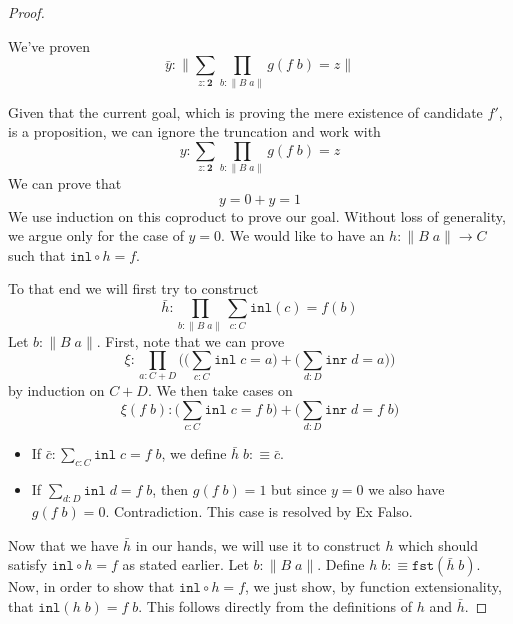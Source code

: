 \documentclass[12pt]{report}
\begin{document}
\begin{proof}
\begin{itemize}
\end{itemize}
We've proven 
$$\bar{y} : \Big\lVert \sum_{z : \mathbf{2}} \prod_{b : \lVert B\; a\rVert} g(f\; b) = z \Big\rVert$$

Given that the current goal, which is proving the mere existence of candidate $f'$, is a proposition, we can ignore the truncation and work with
$$y : \sum_{z : \mathbf{2}} \prod_{b : \lVert B\; a\rVert} g(f\; b) = z$$
We can prove that 
$$y= 0 + y = 1$$ 
We use induction on this coproduct to prove our goal. 
Without loss of generality, we argue only for the case of $y = 0$. 
We would like to have an $h : \lVert B\; a\rVert \rightarrow C$ such that $\mathtt{inl} \circ h = f$. 
\begin{center}
\end{center}
To that end we will first try to construct 
$$\bar{h} : \prod_{b : \lVert B\;a\rVert} \sum_{c:C}\mathtt{inl}(c) = f(b)$$
Let $b : \lVert B\; a\rVert$. 
First, note that we can prove 
$$\xi : \prod_{a: C+D} \Big(\big(\sum_{c : C} \mathtt{inl}\; c = a\big) + \big( \sum_{d:D} \mathtt{inr}\; d = a \big) \Big)$$
by induction on $C+D$. 
We then take cases on 
$$\xi (f\; b) : \big(\sum_{c : C} \mathtt{inl}\; c = f\; b\big) + \big( \sum_{d:D} \mathtt{inr}\; d = f\; b \big)$$
\begin{itemize}
	\item If $\bar{c} : \sum_{c : C} \mathtt{inl}\; c = f\; b$, we define $\bar{h}\; b :\equiv \bar{c}$.
	\item If $\sum_{d : D} \mathtt{inl}\; d = f\; b$, then $g(f\;b) = 1$ but since $y=0$ we also have $g(f\;b) = 0$. Contradiction. 
	This case is resolved by Ex Falso.
\end{itemize}
Now that we have $\bar{h}$ in our hands, we will use it to construct $h$ which should satisfy $\mathtt{inl} \circ h = f$ as stated earlier. 
Let $b:\lVert B\; a\rVert$. 
Define $h\;b :\equiv \mathtt{fst}(\bar{h}\; b)$. 
Now, in order to show that $\mathtt{inl} \circ h = f$, we just show, by function extensionality, that $\mathtt{inl}(h\;b )= f\;b$. 
This follows directly from the definitions of $h$ and $\bar{h}$. 


\end{proof}
\end{document}
